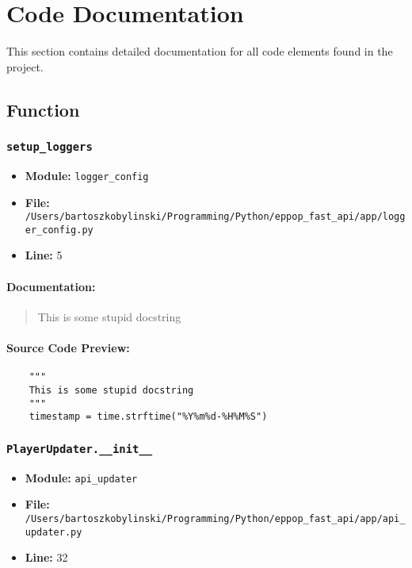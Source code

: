 \documentclass[11pt,a4paper]{article}
\begin{document}
\section{Code Documentation}

This section contains detailed documentation for all code elements found in the project.

\subsection{Function}

\subsubsection{\texttt{setup\_loggers}}

\begin{itemize}
    \item \textbf{Module:} \texttt{logger\_config}
    \item \textbf{File:} \texttt{/Users/bartoszkobylinski/Programming/Python/eppop\_fast\_api/app/logger\_config.py}
    \item \textbf{Line:} 5
\end{itemize}

\paragraph{Documentation:}
\begin{quote}
This is some stupid docstring
\end{quote}

\paragraph{Source Code Preview:}
\begin{verbatim}
    """
    This is some stupid docstring
    """
    timestamp = time.strftime("%Y%m%d-%H%M%S")

\end{verbatim}

\vspace{1em}
\subsubsection{\texttt{PlayerUpdater.\_\_init\_\_}}

\begin{itemize}
    \item \textbf{Module:} \texttt{api\_updater}
    \item \textbf{File:} \texttt{/Users/bartoszkobylinski/Programming/Python/eppop\_fast\_api/app/api\_updater.py}
    \item \textbf{Line:} 32
\end{itemize}
\end{document}
